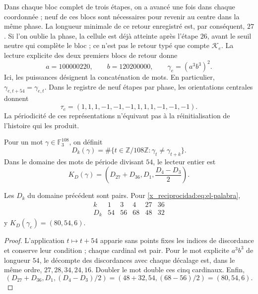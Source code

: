 Dans chaque bloc complet de trois étapes, on a avancé une fois dans chaque
coordonnée ; neuf de ces blocs sont nécessaires pour revenir au centre dans
la même phase. La longueur minimale de ce retour enregistré est, par
conséquent, \(27\). Si l'on oublie la phase, la cellule est déjà atteinte après
l'étape \(26\), avant le seuil neutre qui complète le bloc ; ce n'est pas
le retour typé que compte \(\mathcal K_e\). La lecture explicite
des deux premiers blocs de retour donne
\begin{equation}
 a=100000220,\qquad b=120200000,\qquad
 \gamma_e=(a^3b^3)^2.
 \label{x_reciprocidad:eq:el-palabra}
\end{equation}
Ici, les puissances désignent la concaténation de mots. En particulier,
\(\gamma_{e,t+54}=\gamma_{e,t}\). Dans le registre de neuf étapes par
phase, les orientations centrales donnent
\begin{equation}
 \tau_e=(1,1,1,-1,-1,-1,1,1,1,-1,-1,-1).
 \label{x_reciprocidad:eq:el-tau}
\end{equation}
La périodicité de ces représentations n'équivaut pas à la réinitialisation de l'histoire qui les produit.

\begin{definition}
Pour un mot \(\gamma\in\mathbb F_3^{108}\), on définit
\[
 D_k(\gamma)=\#\{t\in\mathbb Z/108\mathbb Z:
                   \gamma_t\ne\gamma_{t+k}\}.
\]
Dans le domaine des mots de période divisant \(54\), le lecteur entier est
\begin{equation}
 K_D(\gamma)=\left(D_{27}+D_{36},D_1,\frac{D_4-D_3}{2}\right).
 \label{x_reciprocidad:eq:el-kd}
\end{equation}
\end{definition}

\begin{lemma}
Les \(D_k\) du domaine précédent sont pairs. Pour
\eqref{x_reciprocidad:eq:el-palabra},
\[
 \begin{array}{c|rrrrr}
 k&1&3&4&27&36\\\hline
 D_k&54&56&68&48&32
 \end{array}
\]
y \(K_D(\gamma_e)=(80,54,6)\).
\end{lemma}
\begin{proof}
L'application \(t\mapsto t+54\) apparie sans points fixes les indices de discordance et conserve leur condition ; chaque cardinal est pair. Pour le mot explicite \(a^3b^3\) de longueur \(54\), le décompte des discordances avec chaque décalage est, dans le même ordre, \(27,28,34,24,16\). Doubler le mot double ces cinq cardinaux. Enfin,
\[
 (D_{27}+D_{36},D_1,(D_4-D_3)/2)
 =(48+32,54,(68-56)/2)=(80,54,6).
\]
\end{proof}


